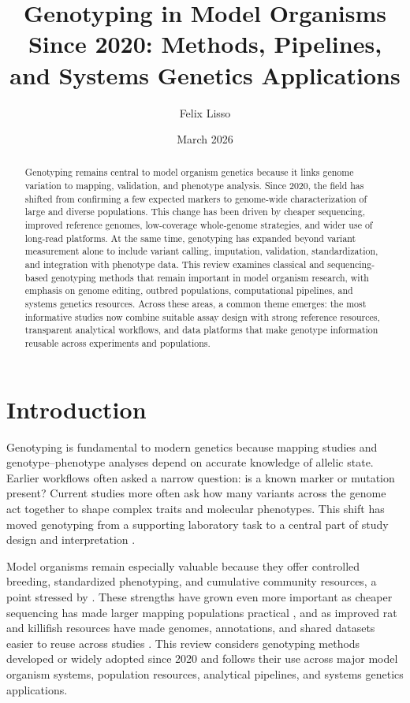 \documentclass{article}
\title{Genotyping in Model Organisms Since 2020: Methods, Pipelines, and Systems Genetics Applications}
\author{Felix Lisso}
\date{March 2026}
\begin{document}
\maketitle

\begin{abstract}
Genotyping remains central to model organism genetics because it links genome variation to mapping, validation, and phenotype analysis. Since 2020, the field has shifted from confirming a few expected markers to genome-wide characterization of large and diverse populations. This change has been driven by cheaper sequencing, improved reference genomes, low-coverage whole-genome strategies, and wider use of long-read platforms. At the same time, genotyping has expanded beyond variant measurement alone to include variant calling, imputation, validation, standardization, and integration with phenotype data. This review examines classical and sequencing-based genotyping methods that remain important in model organism research, with emphasis on genome editing, outbred populations, computational pipelines, and systems genetics resources. Across these areas, a common theme emerges: the most informative studies now combine suitable assay design with strong reference resources, transparent analytical workflows, and data platforms that make genotype information reusable across experiments and populations.
\end{abstract}

\section{Introduction}
Genotyping is fundamental to modern genetics because mapping studies and genotype--phenotype analyses depend on accurate knowledge of allelic state. Earlier workflows often asked a narrow question: is a known marker or mutation present? Current studies more often ask how many variants across the genome act together to shape complex traits and molecular phenotypes. This shift has moved genotyping from a supporting laboratory task to a central part of study design and interpretation \parencite{kockum2023overview,satam2023next,zinski2021genome}.

Model organisms remain especially valuable because they offer controlled breeding, standardized phenotyping, and cumulative community resources, a point stressed by \textcite{matthews2020turn}. These strengths have grown even more important as cheaper sequencing has made larger mapping populations practical \parencite{lou2021beginner}, and as improved rat and killifish resources have made genomes, annotations, and shared datasets easier to reuse across studies \parencite{de2024revamped,poeschla2020turquoise,vedi20232022}. This review considers genotyping methods developed or widely adopted since 2020 and follows their use across major model organism systems, population resources, analytical pipelines, and systems genetics applications.
\end{document}
